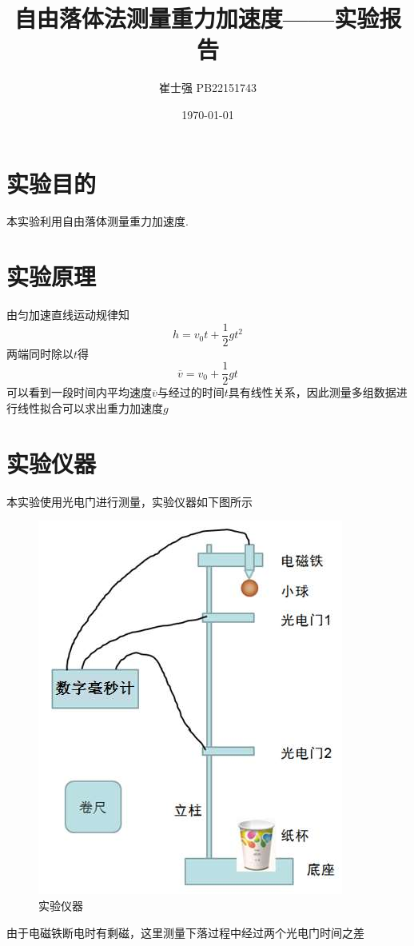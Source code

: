 \documentclass[UTF8]{ctexart}
\title{自由落体法测量重力加速度——实验报告}
\author{崔士强 PB22151743}
\date{\today}
\begin{document}
\maketitle
\section{实验目的}
本实验利用自由落体测量重力加速度.
\section{实验原理}
由匀加速直线运动规律知
\[h=v_0t+\frac{1}{2}gt^2\]
\indent 两端同时除以$t$得
\[\overline{v}=v_0+\frac{1}{2}gt\]
\indent 可以看到一段时间内平均速度$\overline{v}$与经过的时间$t$具有线性关系，因此测量多组数据进行线性拟合可以求出重力加速度$g$
\section{实验仪器}
本实验使用光电门进行测量，实验仪器如下图所示
\begin{figure}[h]
    \centering
    \includegraphics[scale=0.3]{p2.png}
    \caption{实验仪器}
\end{figure}

由于电磁铁断电时有剩磁，这里测量下落过程中经过两个光电门时间之差
\end{document}
